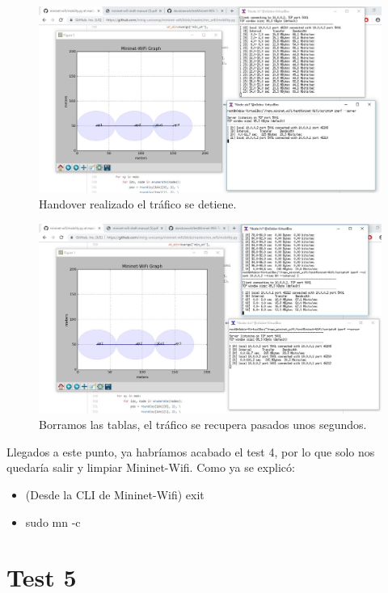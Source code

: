 \begin{figure}[!htb]
  \centering
    \includegraphics[width=\linewidth]{./img/26.JPG}
    \caption{Handover realizado el tráfico se detiene.}
  \label{fig:yo}
\end{figure}
\newpage
\begin{figure}[!htb]
  \centering
    \includegraphics[width=\linewidth]{./img/27.JPG}
    \caption{Borramos las tablas, el tráfico se recupera pasados unos segundos.}
  \label{fig:yo}
\end{figure}
Llegados a este punto, ya habríamos acabado el test 4, por lo que solo nos quedaría salir y limpiar Mininet-Wifi. Como ya se explicó:
\begin{itemize}
    \item (Desde la CLI de Mininet-Wifi) exit
    \item  sudo mn -c
\end{itemize}
\newpage
\section{Test 5}
